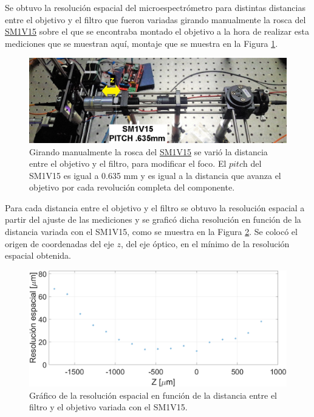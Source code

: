 Se obtuvo la resolución espacial del microespectrómetro para distintas distancias entre el objetivo y el filtro que fueron variadas girando manualmente la rosca del \href{https://www.thorlabs.com/thorproduct.cfm?partnumber=SM1V15}{SM1V15} sobre el que se encontraba montado el objetivo a la hora de realizar esta mediciones que se muestran aquí, montaje que se muestra en la Figura \ref{fig:montajecirc}. 
\begin{figure}[H]
	\centering
	\includegraphics[width=1.0\textwidth]{Figs/microespectrometro/ajustefocoz.jpg}
	\caption{Girando manualmente la rosca del \href{https://www.thorlabs.com/thorproduct.cfm?partnumber=SM1V15}{SM1V15} se varió la distancia entre el objetivo y el filtro, para modificar el foco. El $\textit{pitch}$ del SM1V15 es igual a 0.635 mm y es igual a la distancia que avanza el objetivo por cada revolución completa del componente.}
	\label{fig:montajecirc}
\end{figure}

Para cada distancia entre el objetivo y el filtro se obtuvo la resolución espacial a partir del ajuste de las mediciones y se graficó dicha resolución en función de la distancia variada con el SM1V15, como se muestra en la Figura \ref{fig:resolespz}. Se colocó el origen de coordenadas del eje $\textit{z}$, del eje óptico, en el mínimo de la resolución espacial obtenida. 

\begin{figure}[H]
	\centering
	\includegraphics[width=1.0\textwidth]{Figs/microespectrometro/focoz.png}
	\caption{Gráfico de la resolución espacial en función de la distancia entre el filtro y el objetivo variada con el SM1V15.}
	\label{fig:resolespz}
\end{figure}

